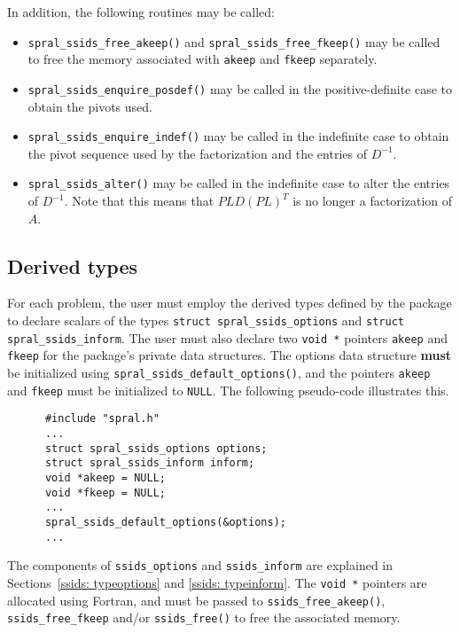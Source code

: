 \noindent
In addition, the following routines may be called:
\begin{itemize}
\item {\tt spral\_ssids\_free\_akeep()} and {\tt spral\_ssids\_free\_fkeep()}
may be called to free the memory associated with {\tt akeep} and {\tt fkeep}
separately.
\item {\tt spral\_ssids\_enquire\_posdef()} may be called
in the  positive-definite case to obtain the pivots used.
\item {\tt spral\_ssids\_enquire\_indef()} may be called
in the indefinite case to obtain the pivot sequence used by the factorization
and the entries of  ${D}^{-1}$.
\item {\tt spral\_ssids\_alter()} may be called in the indefinite case to alter
the entries of ${D}^{-1}$.
Note that this means that  $PLD(PL)^T$ is no longer
a factorization of $A$.

\end{itemize}


\subsection{Derived types} \label{ssids: derived types}

For each problem, the user must employ the derived types defined by the
package to declare scalars of the types {\tt struct spral\_ssids\_options} and
{\tt struct spral\_ssids\_inform}. The user must also declare two
\texttt{void~*} pointers \texttt{akeep} and \texttt{fkeep} for the package's
private data structures. The options data structure \textbf{must} be initialized
using \texttt{spral\_ssids\_default\_options()}, and the pointers \texttt{akeep}
and \texttt{fkeep} must be initialized to \texttt{NULL}.
The following pseudo-code illustrates this.
\begin{verbatim}
      #include "spral.h"
      ...
      struct spral_ssids_options options;
      struct spral_ssids_inform inform;
      void *akeep = NULL;
      void *fkeep = NULL;
      ...
      spral_ssids_default_options(&options);
      ...
\end{verbatim}
The components of {\tt ssids\_options} and {\tt ssids\_inform} are explained
in Sections~\ref{ssids: typeoptions} and \ref{ssids: typeinform}.
The \texttt{void~*} pointers are allocated using Fortran, and must be passed to
\texttt{ssids\_free\_akeep()}, \texttt{ssids\_free\_fkeep} and/or
\texttt{ssids\_free()} to free the associated memory.

